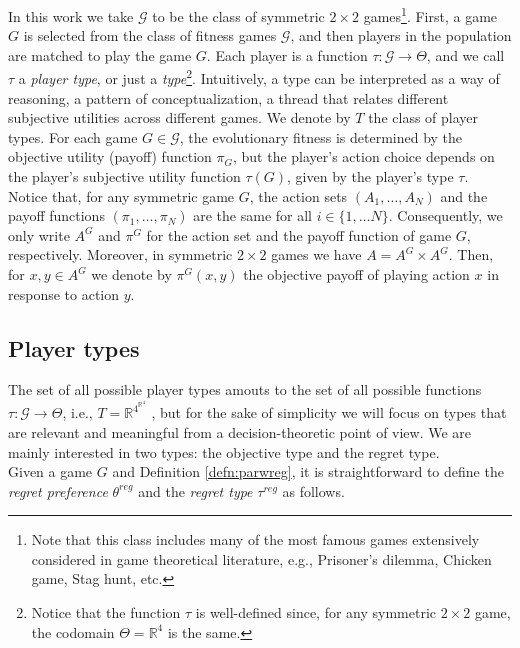 \documentclass[fleqn,reqno,11pt]{article}
\begin{document}
In this work we take $\mathcal{G}$ to be the class of symmetric $2 \times 2$ games\footnote{Note that this class includes many of the most famous games extensively considered in game theoretical literature, e.g., Prisoner's dilemma, Chicken game, Stag hunt, etc.}. First, a game $G$ is selected from the class of fitness games $\mathcal{G}$, and then players in the population are matched to play the game $G$. Each player is a function $\tau: \mathcal{G} \rightarrow  \Theta$, and we call $\tau$ a \textit{player type}, or just a \textit{type}\footnote{Notice that the function $\tau$ is well-defined since, for any symmetric $2 \times 2$ game, the codomain $\Theta=\mathbb{R}^{4}$ is the same.}. Intuitively, a type can be interpreted as a way of reasoning, a pattern of conceptualization, a thread that relates different subjective utilities across different games. We denote by $T$ the class of player types. For each game $G \in \mathcal{G}$, the evolutionary fitness is determined by the objective utility (payoff) function $\pi_G$, but the player's action choice depends on the player's subjective utility function $\tau(G)$, given by the player's type $\tau$. Notice that, for any symmetric game $G$, the action sets $(A_1, \dots, A_N)$ and the payoff functions $ (\pi_1, \dots, \pi_N)  $ are the same for all $i\in \lbrace 1, \dots N \rbrace$. Consequently, we only write $ A^G $ and $ \pi^G $ for the action set and the payoff function of game $G$, respectively. Moreover, in symmetric $2 \times 2$ games we have $A=A^G \times A^G$. Then, for $x,y \in A^G$ we denote by $\pi^G(x,y)$ the objective payoff of playing action $x$ in response to action $y$.\\



\subsection{Player types}

The set of all possible player types amouts to the set of all possible functions $ \tau: \mathcal{G} \rightarrow  \Theta $, i.e., $T=\mathbb{R}^{4^{\mathbb{R}^{4}}} $ , but for the sake of simplicity we will focus on types that are relevant and meaningful from a decision-theoretic point of view. We are mainly interested in two types: the objective type and the regret type.\\
Given a game $G$ and Definition \ref{defn:parwreg}, it is straightforward to define the
\textit{regret preference} $\theta^{reg}$ and the \textit{regret type} $\tau^{reg}$ as
follows. 
\end{document}
